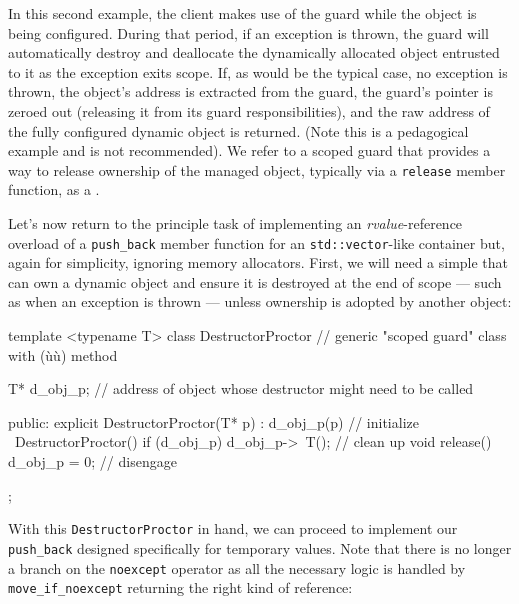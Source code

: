 \noindent In this second example, the client makes use of the guard while the
object is being configured. During that period, if an exception is
thrown, the guard will automatically destroy and deallocate the
dynamically allocated object entrusted to it as the exception exits
scope. If, as would be the typical case, no exception is thrown, the
object's address is extracted from the guard, the guard's pointer is
zeroed out (releasing it from its guard responsibilities), and the raw
address of the fully configured dynamic object is returned. (Note this
is a pedagogical example and is not recommended). We refer to a scoped
guard that provides a way to release ownership of the managed object,
typically via a \lstinline!release! member function, as a .

Let's now return to the principle task of implementing an
\emph{rvalue}-reference overload of a \lstinline!push_back! member
function for an \lstinline!std::vector!-like container but, again for
simplicity, ignoring memory allocators. First, we will need a simple
 that can own a dynamic object and ensure it is
destroyed at the end of scope --- such as when an exception is thrown
--- unless ownership is adopted by another object:

\begin{emcppslisting}
template <typename T>
class DestructorProctor  // generic "scoped guard" class with (ù{}ù) method
{
    T* d_obj_p;  // address of object whose destructor might need to be called

public:
    explicit DestructorProctor(T* p) : d_obj_p(p) { }        // initialize
    ~DestructorProctor() { if (d_obj_p) { d_obj_p->~T(); } } // clean up
    void release() { d_obj_p = 0; }                          // disengage
};
\end{emcppslisting}
    

\noindent With this \lstinline!DestructorProctor! in hand, we can proceed to
implement our \lstinline!push_back! designed specifically for temporary
values. Note that there is no longer a branch on the \lstinline!noexcept!
operator as all the necessary logic is handled by
\lstinline!move_if_noexcept! returning the right kind of reference:

